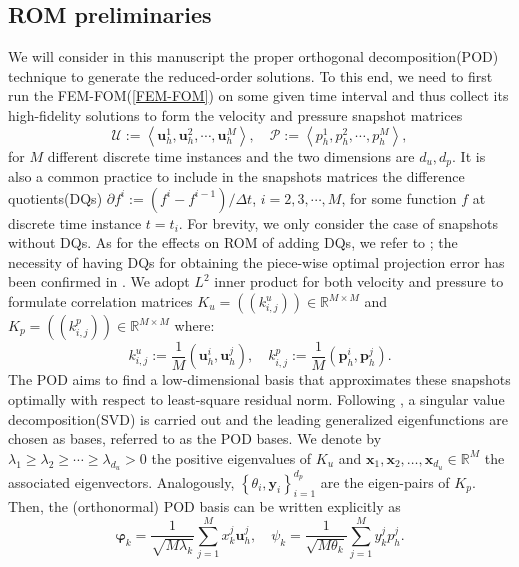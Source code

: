 \documentclass[10pt,twoside,openany,UTF8,CJK]{article}
\begin{document}
    \subsection{ROM preliminaries}
    \indent We will consider in this manuscript the proper orthogonal decomposition(POD) technique to generate the reduced-order solutions. To this end, we need to first run the FEM-FOM(\ref{FEM-FOM}) on some given time interval and thus collect its high-fidelity solutions to form the velocity and pressure snapshot matrices 
    $$
    \mathcal{U} :=\left\langle\boldsymbol{u}_h^{1}, \boldsymbol{u}_h^{2}, \cdots, \boldsymbol{u}_h^{M}\right\rangle,\quad\mathcal{P} :=\left\langle p_h^{1}, p_h^{2}, \cdots, p_h^{M}\right\rangle,
    $$
    for $M$ different discrete time instances and the two dimensions are $d_u,d_p$. It is also a common practice to include in the snapshots matrices the difference quotients(DQs) $\partial f^{i} := (f^i - f^{i-1})/\Delta t$, $i=2,3,\cdots,M$, for some function $f$ at discrete time instance $t=t_i$. For brevity, we only consider the case of snapshots without DQs. As for the effects on ROM of adding DQs, we refer to \cite{Iliescu-Wang-2014-SISC}; the necessity of having DQs for obtaining the piece-wise optimal projection error has been confirmed in \cite{Koc-TimePointwise-SINUM-2021}. We adopt $L^2$ inner product for both velocity and pressure to formulate correlation matrices $K_u=\left(\left(k^u_{i, j}\right)\right) \in \mathbb{R}^{M \times M}$ and $K_p=\left(\left(k^p_{i, j}\right)\right) \in \mathbb{R}^{M \times M}$ where:
    $$
    k^u_{i, j} := \frac{1}{M}(\boldsymbol{u}_h^{i}, \boldsymbol{u}_h^{j}),\quad k^p_{i, j} := \frac{1}{M}(\boldsymbol{p}_h^{i}, \boldsymbol{p}_h^{j}).
    $$
    The POD aims to find a low-dimensional basis that approximates these snapshots optimally with respect to least-square residual norm. Following \cite{Galerkin-POD-NM-2001}, a singular value decomposition(SVD) is carried out and the leading generalized eigenfunctions are chosen as bases, referred to as the POD bases. We denote by $\lambda_1 \geq \lambda_2 \geq \cdots \geq \lambda_{d_u}>0$ the positive eigenvalues of $K_u$ and $\boldsymbol{x}_1, \boldsymbol{x}_2, \ldots, \boldsymbol{x}_{d_{u}} \in \mathbb{R}^{M}$ the associated eigenvectors. Analogously, $\left\{\theta_i, \boldsymbol{y}_i\right\}_{i=1}^{d_p}$ are the eigen-pairs of $K_p$. Then, the (orthonormal) POD basis can be written explicitly as
    $$
    \boldsymbol{\varphi}_k = \frac{1}{\sqrt{M\lambda_k}} \sum_{j=1}^M x_k^j \boldsymbol{u}^j_h,\quad
    \psi_k = \frac{1}{\sqrt{M\theta_k}} \sum_{j=1}^M y_k^j p^j_h.
    $$
\end{document}
